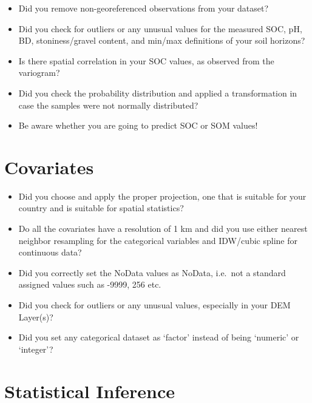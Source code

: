 \documentclass[10pt,b5paper,]{book}
\providecommand{\tightlist}{%
  \setlength{\itemsep}{0pt}\setlength{\parskip}{0pt}}
\theoremstyle{definition}
\theoremstyle{definition}
\theoremstyle{definition}
\theoremstyle{remark}
\begin{document}
\begin{itemize}
\tightlist
\item
  Did you remove non-georeferenced observations from your dataset?
\item
  Did you check for outliers or any unusual values for the measured SOC,
  pH, BD, stoniness/gravel content, and min/max definitions of your soil
  horizons?
\item
  Is there spatial correlation in your SOC values, as observed from the
  variogram?
\item
  Did you check the probability distribution and applied a
  transformation in case the samples were not normally distributed?
\item
  Be aware whether you are going to predict SOC or SOM values!
\end{itemize}

\hypertarget{covariates-1}{%
\section{Covariates}\label{covariates-1}}

\begin{itemize}
\tightlist
\item
  Did you choose and apply the proper projection, one that is suitable
  for your country and is suitable for spatial statistics?
\item
  Do all the covariates have a resolution of 1 km and did you use either
  nearest neighbor resampling for the categorical variables and
  IDW/cubic spline for continuous data?
\item
  Did you correctly set the NoData values as NoData, i.e.~not a standard
  assigned values such as -9999, 256 etc.
\item
  Did you check for outliers or any unusual values, especially in your
  DEM Layer(s)?
\item
  Did you set any categorical dataset as `factor' instead of being
  `numeric' or `integer'?
\end{itemize}

\hypertarget{statistical-inference}{%
\section{Statistical Inference}\label{statistical-inference}}
\end{document}
